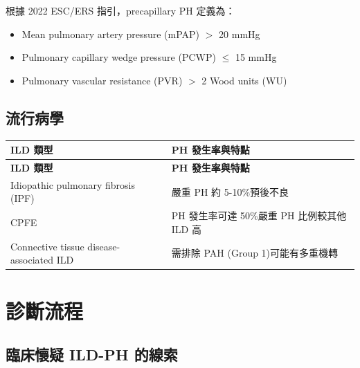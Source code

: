 \documentclass[11pt,a4paper]{article}
\begin{document}
根據 2022 ESC/ERS 指引，precapillary PH 定義為：
\begin{itemize}
    \item Mean pulmonary artery pressure (mPAP) $>$ 20 mmHg
    \item Pulmonary capillary wedge pressure (PCWP) $\leq$ 15 mmHg
    \item Pulmonary vascular resistance (PVR) $>$ 2 Wood units (WU)
\end{itemize}

\subsection{流行病學}

\begin{longtable}{p{5cm}p{9cm}}
\toprule
\textbf{ILD 類型} & \textbf{PH 發生率與特點} \\
\midrule
\endfirsthead
\toprule
\textbf{ILD 類型} & \textbf{PH 發生率與特點} \\
\midrule
\endhead
Idiopathic pulmonary fibrosis (IPF) & 嚴重 PH 約 5-10\%\newline 預後不良 \\
\midrule
CPFE & PH 發生率可達 50\%\newline 嚴重 PH 比例較其他 ILD 高 \\
\midrule
Connective tissue disease-associated ILD & 需排除 PAH (Group 1)\newline 可能有多重機轉 \\
\bottomrule
\end{longtable}

\section{診斷流程}

\subsection{臨床懷疑 ILD-PH 的線索}
\end{document}
